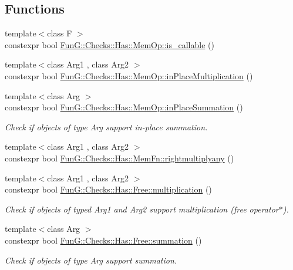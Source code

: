 \subsection*{Functions}
\begin{DoxyCompactItemize}
\item 
{\footnotesize template$<$class F $>$ }\\constexpr bool \hyperlink{namespaceFunG_1_1Checks_1_1Has_1_1MemOp_a5810c07eff37faaf76b881548a6722bd}{Fun\+G\+::\+Checks\+::\+Has\+::\+Mem\+Op\+::is\+\_\+callable} ()
\item 
{\footnotesize template$<$class Arg1 , class Arg2 $>$ }\\constexpr bool \hyperlink{namespaceFunG_1_1Checks_1_1Has_1_1MemOp_ae8e502928ebc6342cab98ebbb62b8802}{Fun\+G\+::\+Checks\+::\+Has\+::\+Mem\+Op\+::in\+Place\+Multiplication} ()
\item 
{\footnotesize template$<$class Arg $>$ }\\constexpr bool \hyperlink{namespaceFunG_1_1Checks_1_1Has_1_1MemOp_a23052f7d8da399943f6354a7d477c825}{Fun\+G\+::\+Checks\+::\+Has\+::\+Mem\+Op\+::in\+Place\+Summation} ()
\begin{DoxyCompactList}\small\item\em Check if objects of type Arg support in-\/place summation. \end{DoxyCompactList}\item 
{\footnotesize template$<$class Arg1 , class Arg2 $>$ }\\constexpr bool \hyperlink{namespaceFunG_1_1Checks_1_1Has_1_1MemFn_adeb3d401c6464514644930596c3a4ccc}{Fun\+G\+::\+Checks\+::\+Has\+::\+Mem\+Fn\+::rightmultiplyany} ()
\item 
{\footnotesize template$<$class Arg1 , class Arg2 $>$ }\\constexpr bool \hyperlink{namespaceFunG_1_1Checks_1_1Has_1_1Free_a2454bd1f5873cc86ec31d09d822a67b1}{Fun\+G\+::\+Checks\+::\+Has\+::\+Free\+::multiplication} ()
\begin{DoxyCompactList}\small\item\em Check if objects of typed Arg1 and Arg2 support multiplication (free operator$\ast$). \end{DoxyCompactList}\item 
{\footnotesize template$<$class Arg $>$ }\\constexpr bool \hyperlink{namespaceFunG_1_1Checks_1_1Has_1_1Free_a1cf46f7335354d21dff506aaf812b4f5}{Fun\+G\+::\+Checks\+::\+Has\+::\+Free\+::summation} ()
\begin{DoxyCompactList}\small\item\em Check if objects of type Arg support summation. \end{DoxyCompactList}\item 

\end{DoxyCompactItemize}
